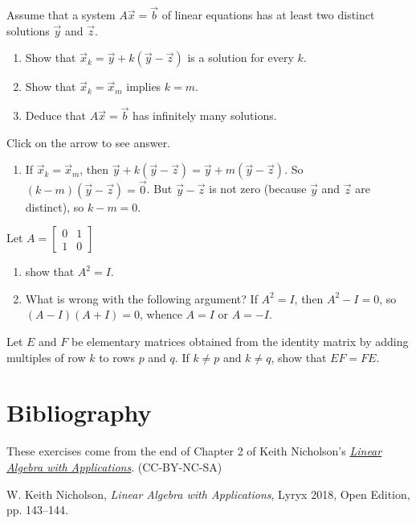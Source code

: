 \documentclass{ximera}
\begin{document}
\begin{problem}\label{prob:4.78}
Assume that a system $A\vec{x} = \vec{b}$ of linear equations has at least two distinct solutions $\vec{y}$ and $\vec{z}$.

\begin{enumerate}
\item Show that $\vec{x}_{k} = \vec{y} + k(\vec{y} - \vec{z})$ is a solution for every $k$.

\item Show that $\vec{x}_{k} = \vec{x}_{m}$ implies $k = m$. 

\item Deduce that $A\vec{x} = \vec{b}$ has infinitely many solutions.

\end{enumerate}

Click on the arrow to see answer.
\begin{expandable}{}{}
\begin{enumerate}
\item  If $\vec{x}_{k} = \vec{x}_{m}$, then $\vec{y} + k(\vec{y} - \vec{z}) = \vec{y} + m(\vec{y} - \vec{z})$. So $(k - m)(\vec{y} - \vec{z}) = \vec{0}$. But $\vec{y} - \vec{z}$ is not zero (because $\vec{y}$ and $\vec{z}$ are distinct), so $k - m = 0$.
\end{enumerate}
\end{expandable}
\end{problem}

\begin{problem}\label{prob:4.81}
Let $A = \left[ \begin{array}{rr}
0 & 1 \\
1 & 0
\end{array} \right]$
\begin{enumerate}
\item 
 show that $A^{2} = I$.
\item What is wrong with the following argument? If $A^{2} = I$, then $A^{2} - I = 0$, so $(A - I)(A + I) = 0$, whence $A = I$ or $A = -I$.
\end{enumerate}
\end{problem}

\begin{problem}\label{prob:4.82}
Let $E$ and $F$ be elementary matrices obtained from the identity matrix by adding multiples of row $k$ to rows $p$ and $q$. If $k \neq p$ and $k \neq q$, show that $EF = FE$.

\end{problem}



\section*{Bibliography}
These exercises come from the end of Chapter 2 of Keith Nicholson's \href{https://open.umn.edu/opentextbooks/textbooks/linear-algebra-with-applications}{\it Linear Algebra with Applications}. (CC-BY-NC-SA)

W. Keith Nicholson, {\it Linear Algebra with Applications}, Lyryx 2018, Open Edition, pp. 143--144. 
\end{document}
